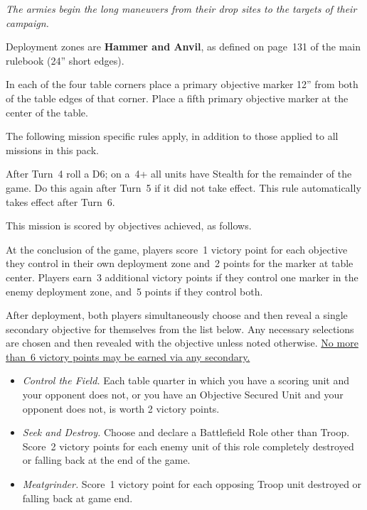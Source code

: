 \clearpage
{}

\centerline{\emph{The armies begin the long maneuvers from their drop
    sites to the targets of their campaign.}}


Deployment zones are \textbf{Hammer and Anvil}, as defined on page~131
of the main rulebook (24'' short edges).

\bigskip%
In each of the four table corners place a primary objective marker
12'' from both of the table edges of that corner.  Place a fifth
primary objective marker at the center of the table.


The following mission specific rules apply, in addition to those
applied to all missions in this pack.

  After Turn~4 roll a D6; on a~4+
all units have Stealth for the remainder of the game.  Do this again
after Turn~5 if it did not take effect.  This rule automatically takes
effect after Turn~6.



This mission is scored by objectives achieved, as follows.

 At the conclusion of the game,
players score~1 victory point for each objective they control in their
own deployment zone and~2 points for the marker at table center.
Players earn~3 additional victory points if they control one marker in
the enemy deployment zone, and~5 points if they control both.


After deployment, both players simultaneously choose and then reveal a
single secondary objective for themselves from the list below.  Any
necessary selections are chosen and then revealed with the objective
unless noted otherwise.  \underline{No more than~6 victory points may
  be earned via any secondary.}

\begin{itemize}
\item \textit{Control the Field.}  Each table quarter in which you
  have a scoring unit and your opponent does not, or you have an
  Objective Secured Unit and your opponent does not, is worth 2
  victory points.

\item \textit{Seek and Destroy.}  Choose and declare a Battlefield
  Role other than Troop.  Score~2 victory points for each enemy unit
  of this role completely destroyed or falling back at the end of the
  game.

\item \textit{Meatgrinder.}  Score~1 victory point for each opposing
  Troop unit destroyed or falling back at game end.

\end{itemize}

\tertiaries
